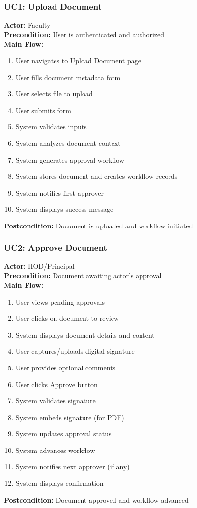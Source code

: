 \subsubsection{UC1: Upload Document}
\textbf{Actor:} Faculty\\
\textbf{Precondition:} User is authenticated and authorized\\
\textbf{Main Flow:}
\begin{enumerate}
\item User navigates to Upload Document page
\item User fills document metadata form
\item User selects file to upload
\item User submits form
\item System validates inputs
\item System analyzes document context
\item System generates approval workflow
\item System stores document and creates workflow records
\item System notifies first approver
\item System displays success message
\end{enumerate}
\textbf{Postcondition:} Document is uploaded and workflow initiated

\subsubsection{UC2: Approve Document}
\textbf{Actor:} HOD/Principal\\
\textbf{Precondition:} Document awaiting actor's approval\\
\textbf{Main Flow:}
\begin{enumerate}
\item User views pending approvals
\item User clicks on document to review
\item System displays document details and content
\item User captures/uploads digital signature
\item User provides optional comments
\item User clicks Approve button
\item System validates signature
\item System embeds signature (for PDF)
\item System updates approval status
\item System advances workflow
\item System notifies next approver (if any)
\item System displays confirmation
\end{enumerate}
\textbf{Postcondition:} Document approved and workflow advanced

